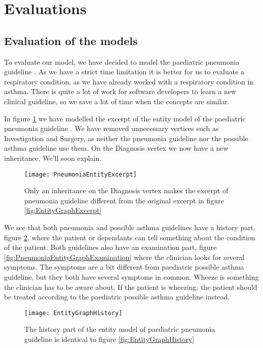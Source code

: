 
\section{Evaluations}
\subsection{Evaluation of the models}
To evaluate our model, we have decided to model the paediatric pneumonia guideline \parencite{RepublicofKeny2016}. As we have a strict time limitation it is better for us to evaluate a respiratory condition, as we have already worked with a respiratory condition in asthma. There is quite a lot of work for software developers to learn a new clinical guideline, so we save a lot of time when the concepts are similar.

In figure \ref{fig:PneumoniaEntityGraphExcerpt} we have modelled the excerpt of the entity model of the paediatric pneumonia guideline \parencite{RepublicofKeny2016}. We have removed unnecessary vertices such as Investigation and Surgery, as neither the pneumonia guideline nor the possible asthma guideline use them. On the Diagnosis vertex we now have a new inheritance. We'll soon explain.

\begin{figure}[h!]
	\texttt{[image: PneumoniaEntityExcerpt]}
	\caption {Only an inheritance on the Diagnosis vertex makes the excerpt of pneumonia guideline \parencite{RepublicofKeny2016} different from the original excerpt in figure \ref{fig:EntityGraphExcerpt}}
	\label{fig:PneumoniaEntityGraphExcerpt}
\end{figure}

We see that both pneumonia and possible asthma guidelines have a history part, figure \ref{fig:PneumoniaEntityGraphHistory}, where the patient or dependants can tell something about the condition of the patient. Both guidelines also have an examination part, figure \ref{fig:PneumoniaEntityGraphExamination} where the clinician looks for several symptoms. The symptoms are a bit different from paediatric possible asthma guideline, but they both have several symptoms in common. Wheeze is something the clinician has to be aware about. If the patient is wheezing, the patient should be treated according to the paediatric possible asthma guideline instead.

\begin{figure}[h!]
	\texttt{[image: EntityGraphHistory]}
	\caption {The history part of the entity model of paediatric pneumonia guideline \parencite{RepublicofKeny2016} is identical to figure \ref{fig:EntityGraphHistory}}
	\label{fig:PneumoniaEntityGraphHistory}
\end{figure}

